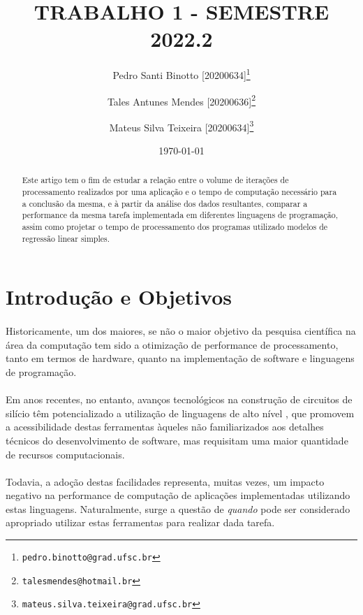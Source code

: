 \documentclass[11pt]{article}
\title{TRABALHO 1 - SEMESTRE 2022.2}
\author[1]{Pedro Santi Binotto [20200634]\thanks{\texttt{pedro.binotto@grad.ufsc.br}}}
\author[1]{Tales Antunes Mendes [20200636]\thanks{\texttt{talesmendes@hotmail.br}}}
\author[1]{Mateus Silva Teixeira [20200634]\thanks{\texttt{mateus.silva.teixeira@grad.ufsc.br}}}
\date{\today}
\affil[1]{Departamento de Informática e Estatística, Universidade Federal de Santa Catarina}
\begin{document}
\maketitle

\begin{abstract}
Este artigo tem o fim de estudar a relação entre o volume de iterações de
processamento realizados por uma aplicação e o tempo de computação necessário
para a conclusão da mesma, e à partir da análise dos dados resultantes,
comparar a performance da mesma tarefa implementada em diferentes linguagens de
programação, assim como projetar o tempo de processamento dos programas 
utilizado modelos de regressão linear simples.
\end{abstract}

\newpage
\section{Introdução e Objetivos}
\paragraph{}
Historicamente, um dos maiores, se não o maior objetivo da pesquisa científica
na área da computação tem sido a otimização de performance de processamento,
tanto em termos de hardware\cite{schaller1997moore}, quanto na implementação de
software e linguagens de programação.

\paragraph{}
Em anos recentes, no entanto, avanços tecnológicos na construção de circuitos
de silício têm potencializado a utilização de linguagens de alto nível
\cite{srinath2017python}, que promovem a acessibilidade destas ferramentas
àqueles não familiarizados aos detalhes técnicos do desenvolvimento de software,
mas requisitam uma maior quantidade de recursos computacionais.

\paragraph{}
Todavia, a adoção destas facilidades representa, muitas vezes, um impacto
negativo na performance de computação de aplicações implementadas utilizando
estas linguagens\cite{prechelt2000empirical}. Naturalmente, surge a questão de
\textit{quando} pode ser considerado apropriado utilizar estas ferramentas para
realizar dada tarefa.
\end{document}
